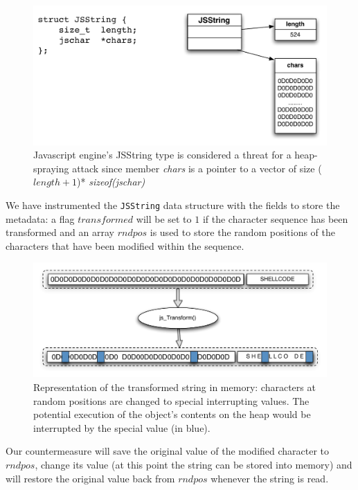 \begin{figure}[htbp]
\begin{center}
\includegraphics[scale=0.4]{images/jsstring.pdf}
\caption{{Javascript engine's JSString type is considered a threat for a heap-spraying attack since member \emph{chars} is a pointer to a vector of size ($length+1$)* \emph{sizeof(jschar)} }}
\label{jsstring}
\end{center}
\end{figure}

We have instrumented the \texttt{JSString} data structure with the fields to store the metadata: a flag $transformed$ will be set to $1$ if the character sequence has been transformed and an array $rndpos$ is used to store the random positions of the characters that have been modified within the sequence.

\begin{figure}[htbp]
\begin{center}
\includegraphics[scale=0.5]{images/stringint}
\caption{{Representation of the transformed string in memory: characters at random positions are changed to special interrupting values. The potential execution of the object's contents on the heap would be interrupted by the special value (in blue).}}
\label{stringrepr}
\end{center}
\end{figure}

Our countermeasure will save the original value of the modified character to $rndpos$, change its value (at this point the string can be stored into memory) and will restore the original value back from $rndpos$ whenever the string is read.


